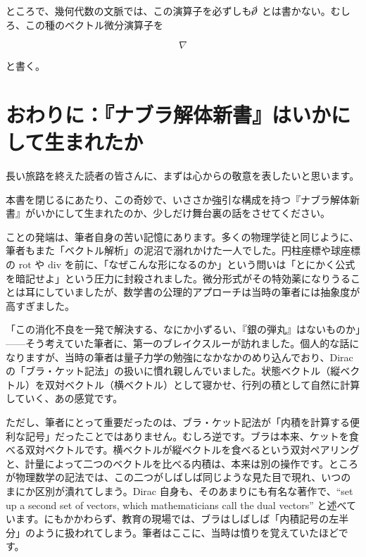 \documentclass[a4paper,12pt,openany]{book}
\begin{document}
ところで、幾何代数の文脈では、この演算子を必ずしも\(\cancel{\partial}\)
とは書かない。むしろ、この種のベクトル微分演算子を

\[
\nabla
\]

と書く。

\newpage


\backmatter
\hypertarget{ux304aux308fux308aux306bux30caux30d6ux30e9ux89e3ux4f53ux65b0ux66f8ux306fux3044ux304bux306bux3057ux3066ux751fux307eux308cux305fux304b}{%
\chapter{おわりに：『ナブラ解体新書』はいかにして生まれたか}\label{ux304aux308fux308aux306bux30caux30d6ux30e9ux89e3ux4f53ux65b0ux66f8ux306fux3044ux304bux306bux3057ux3066ux751fux307eux308cux305fux304b}}

長い旅路を終えた読者の皆さんに、まずは心からの敬意を表したいと思います。

本書を閉じるにあたり、この奇妙で、いささか強引な構成を持つ『ナブラ解体新書』がいかにして生まれたのか、少しだけ舞台裏の話をさせてください。

ことの発端は、筆者自身の苦い記憶にあります。多くの物理学徒と同じように、筆者もまた「ベクトル解析」の泥沼で溺れかけた一人でした。円柱座標や球座標の
\(\mathrm{rot}\) や \(\mathrm{div}\)
を前に、「なぜこんな形になるのか」という問いは「とにかく公式を暗記せよ」という圧力に封殺されました。微分形式がその特効薬になりうることは耳にしていましたが、数学書の公理的アプローチは当時の筆者には抽象度が高すぎました。

「この消化不良を一発で解決する、なにか小ずるい、『銀の弾丸』はないものか」——そう考えていた筆者に、第一のブレイクスルーが訪れました。個人的な話になりますが、当時の筆者は量子力学の勉強になかなかのめり込んでおり、Dirac
の「ブラ・ケット記法」の扱いに慣れ親しんでいました。状態ベクトル（縦ベクトル）を双対ベクトル（横ベクトル）として寝かせ、行列の積として自然に計算していく、あの感覚です。

ただし、筆者にとって重要だったのは、ブラ・ケット記法が「内積を計算する便利な記号」だったことではありません。むしろ逆です。ブラは本来、ケットを食べる双対ベクトルです。横ベクトルが縦ベクトルを食べるという双対ペアリングと、計量によって二つのベクトルを比べる内積は、本来は別の操作です。ところが物理数学の記法では、この二つがしばしば同じような見た目で現れ、いつのまにか区別が潰れてしまう。Dirac
自身も、そのあまりにも有名な著作で、``set up a second set of vectors,
which mathematicians call the dual vectors''
と述べています。にもかかわらず、教育の現場では、ブラはしばしば「内積記号の左半分」のように扱われてしまう。筆者はここに、当時は憤りを覚えていたほどです。
\end{document}
